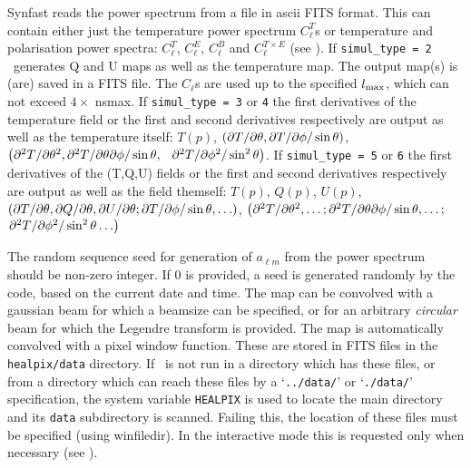 \begin{codedescription}
{%
Synfast reads the power spectrum from a file in  ascii FITS
format. This can contain either just the temperature power spectrum $C^T_{\ell}$s or 
temperature and polarisation power spectra: $C^T_{\ell}$, $C^E_{\ell}$, $C^B_{\ell}$
and $C^{T\times E}_{\ell}$ (see ). If {\tt simul\_type = 2} \thedocid\ generates 
Q and U maps as well as the temperature map. The output map(s)
is (are) saved in a FITS file. 
The $C_{\ell}$s are used up to the specified 
$l_{\textrm{max}}$, which can not exceed $4\times$ nsmax. If {\tt simul\_type = 3} or
{\tt 4} the first derivatives of the temperature field or the first and second derivatives respectively
are output as well as the temperature itself: $T(p)$, $\left({\partial T}/{\partial \theta}, {\partial T}/{\partial \phi}/\sin\theta \right)
$, $\left({\partial^2 T}/{\partial \theta^2}, {\partial^2 T}/{\partial
  \theta\partial\phi}/\sin\theta,\right.$ 
$\left.{\partial^2 T}/{\partial \phi^2}/\sin^2\theta \right)$.
If {\tt simul\_type = 5} or
{\tt 6} the first derivatives of the (T,Q,U) fields or the first and second derivatives respectively
are output as well as the field themself: $T(p)$,  $Q(p)$,  $U(p)$,
$\left({\partial T}/{\partial \theta}, {\partial Q}/{\partial \theta}, {\partial
  U}/{\partial \theta}; {\partial T}/{\partial \phi}/\sin\theta, \ldots \right)
$, $\left({\partial^2 T}/{\partial \theta^2},\ldots; {\partial^2 T}/{\partial
  \theta\partial\phi}/\sin\theta,\ldots ;\right.$ 
$\left.{\partial^2 T}/{\partial \phi^2}/\sin^2\theta \ldots \right)$

The random sequence seed for generation of $a_{\ell m}$ from the
power spectrum should be non-zero integer. If 0 is provided, a seed is generated
randomly by the code, based on the current date and time.
The map can be convolved with a gaussian beam for which a beamsize can
be specified, or for an arbitrary {\em circular} beam for which the
Legendre transform is provided. The map is automatically convolved with a pixel window
function. These are stored in FITS files  in
the {\tt healpix/data} directory. If \thedocid\ is not run in a directory
which has these files, or from a directory which can reach these files
by a `{\tt ../data/}' or `{\tt ./data/}' specification, the system
variable {\tt HEALPIX} is used to locate the main \healpix directory
and its {\tt data} subdirectory is scanned. Failing this, the location of these
files must be specified (using winfiledir). In the interactive mode this is
requested only when necessary (see 
).

}
\end{codedescription}
